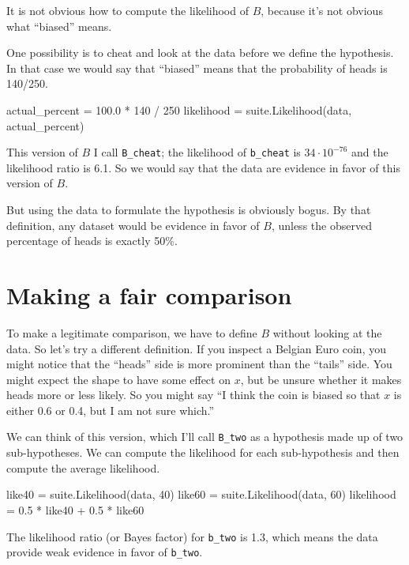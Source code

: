 \documentclass[12pt]{book}
\theoremstyle{exercise}
\begin{document}
It is not obvious how to compute the likelihood of $B$, because
it's not obvious what ``biased'' means.

One possibility is to cheat and look at the data before we define
the hypothesis.  In that case we would say that ``biased'' means that
the probability of heads is 140/250.

\begin{code}
    actual_percent = 100.0 * 140 / 250
    likelihood = suite.Likelihood(data, actual_percent)
\end{code}

This version of $B$ I call \verb"B_cheat"; the likelihood of
\verb"b_cheat" is $34 \cdot 10^{-76}$ and the likelihood ratio is
6.1.  So we would say that the data are evidence in favor of this
version of $B$.

But using the data to formulate the hypothesis
is obviously bogus.  By that definition, any dataset would
be evidence in favor of $B$, unless the observed percentage of heads
is exactly 50\%.

\section{Making a fair comparison}
\label{suitelike}

To make a legitimate comparison, we have to define $B$ without looking
at the data.  So let's try a different definition.  If you inspect
a Belgian Euro coin, you might notice that the ``heads'' side is more
prominent than the ``tails'' side.  You might expect the shape to 
have some effect on
$x$, but be unsure whether it makes heads more or less
likely.  So you might say ``I think the coin is biased so that
$x$ is either 0.6 or 0.4, but I am not sure which.''

We can think of this version, which I'll call \verb"B_two"
as a hypothesis made up of two
sub-hypotheses.  We can compute the likelihood for each
sub-hypothesis and then compute the average likelihood.

\begin{code}
    like40 = suite.Likelihood(data, 40)
    like60 = suite.Likelihood(data, 60)
    likelihood = 0.5 * like40 + 0.5 * like60
\end{code}

The likelihood ratio (or Bayes factor) for \verb"b_two" is 1.3, which
means the data provide weak evidence in favor of \verb"b_two".
\end{document}
